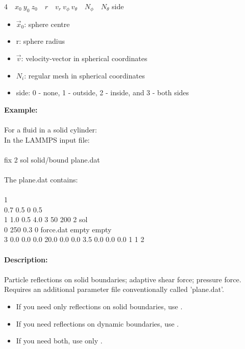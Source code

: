 \begin{enumerate}
\begin{enumerate}
		$4\quad x_0\ y_0\ z_0\quad r\quad v_r\ v_{\phi}\ v_{\theta}\quad N_{\phi}\quad N_{\theta}$ { side}
		\begin{itemize}
	   	\item $\vec{x}_0$: sphere centre
	   	\item r: sphere radius
	   	\item $\vec{v}$: velocity-vector in spherical coordinates
	   	\item $ N_i$: regular mesh in spherical coordinates
	   	\item side: 0 - none, 1 - outside, 2 - inside, and 3 - both sides
		\end{itemize}
	\end{enumerate}

\end{enumerate}

\textbf{Example:}\\ \\
For a fluid in a solid cylinder:\\
In the LAMMPS input file:\\ \\
fix	2 sol solid/bound plane.dat\\ \\
The plane.dat contains:\\ \\
1\\
0.7 0.5 0 0.5\\
1 1.0 0.5 4.0 3 50 200 2 sol\\
0 250 0.3 0 force.dat empty empty\\
3 0.0 0.0 0.0 20.0 0.0 0.0 3.5 0.0 0.0 0.0 1 1 2\\ \\

\textbf{Description:}\\ \\
Particle reflections on solid boundaries; adaptive shear force; pressure force.\\Requires an additional parameter file conventionally called 'plane.dat'.
\begin{itemize}
\item If you need only reflections on solid boundaries, use .
\item If you need reflections on dynamic boundaries, use .
\item If you need both, use only .
\end{itemize}

